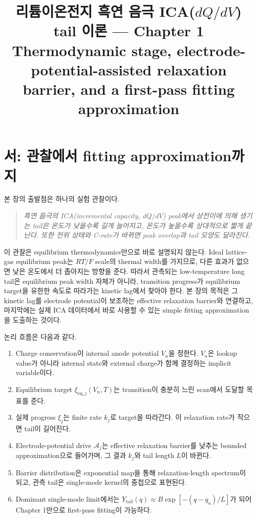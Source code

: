 \documentclass[11pt,a4paper]{article}
\title{\textbf{리튬이온전지 흑연 음극 ICA($dQ/dV$) tail 이론 --- Chapter 1}\\[0.4em]
\large Thermodynamic stage, electrode-potential-assisted relaxation barrier, and a first-pass fitting approximation}
\author{}\date{}
\newcommand{\eq}{\mathrm{eq}}
\newcommand{\tail}{\mathrm{tail}}
\begin{document}
\maketitle

\section*{서: 관찰에서 fitting approximation까지}
본 장의 출발점은 하나의 실험 관찰이다.
\begin{quote}\itshape
흑연 음극의 ICA(incremental capacity, $dQ/dV$) peak에서 상전이에 의해 생기는 tail은 온도가 낮을수록 길게 늘어지고,
온도가 높을수록 상대적으로 짧게 끝난다. 또한 전위 상태와 C-rate가 바뀌면 peak overlap과 tail 모양도 달라진다.
\end{quote}

이 관찰은 equilibrium thermodynamics만으로 바로 설명되지 않는다. Ideal lattice-gas equilibrium peak는 $RT/F$ scale의
thermal width를 가지므로, 다른 효과가 없으면 낮은 온도에서 더 좁아지는 방향을 준다. 따라서 관측되는 low-temperature
long tail은 equilibrium peak width 자체가 아니라, transition progress가 equilibrium target을 유한한 속도로 따라가는
kinetic lag에서 찾아야 한다. 본 장의 목적은 그 kinetic lag를 electrode potential이 보조하는 effective relaxation barrier와
연결하고, 마지막에는 실제 ICA 데이터에서 바로 사용할 수 있는 simple fitting approximation을 도출하는 것이다.

논리 흐름은 다음과 같다.
\begin{enumerate}[label=\textbf{(\arabic*)},leftmargin=2.2em]
\item Charge conservation이 internal anode potential $V_n$을 정한다. $V_n$은 lookup value가 아니라 internal state와 external charge가 함께 결정하는 implicit variable이다.
\item Equilibrium target $\xi_{\eq,j}(V_n,T)$는 transition이 충분히 느린 scan에서 도달할 목표를 준다.
\item 실제 progress $\xi_j$는 finite rate $k_j$로 target을 따라간다. 이 relaxation rate가 작으면 tail이 길어진다.
\item Electrode-potential drive $\mathcal A_j$는 effective relaxation barrier를 낮추는 bounded approximation으로 들어가며, 그 결과 $k_j$와 tail length $L$이 바뀐다.
\item Barrier distribution은 exponential map을 통해 relaxation-length spectrum이 되고, 관측 tail은 single-mode kernel의 중첩으로 표현된다.
\item Dominant single-mode limit에서는 $Y_{\tail}(q)\approx B\exp[-(q-q_a)/L]$가 되어 Chapter 1만으로 first-pass fitting이 가능하다.
\end{enumerate}
\end{document}
